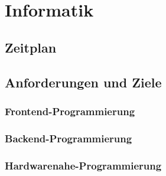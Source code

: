 
\chapter{Informatik}\label{ch:informatik}



\section{Zeitplan}\label{subsec:zeitplan}
\section{Anforderungen und Ziele}\label{subsec:anforderungen-und-ziele}

\subsection{Frontend-Programmierung}
\subsection{Backend-Programmierung}
\subsection{Hardwarenahe-Programmierung}


